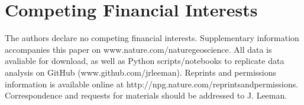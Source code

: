 \documentclass[11pt]{article}
\begin{document}
\section{Competing Financial Interests}
The authors declare no competing financial interests. Supplementary information
accompanies this paper on www.nature.com/naturegeoscience. All data is avaliable
for download, as well as Python scripts/notebooks to replicate data analysis on
GitHub (www.github.com/jrleeman). Reprints and permissions information is
available online at http://npg.nature.com/reprintsandpermissions. Correspondence
and requests for materials should be addressed to J. Leeman.
\end{document}
